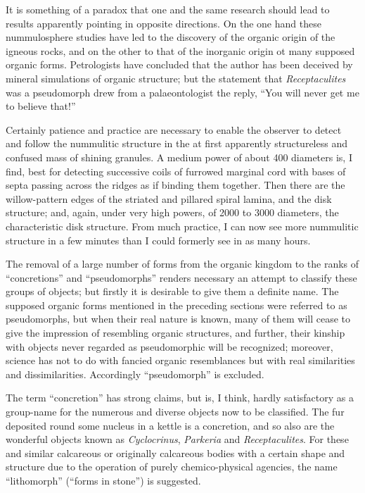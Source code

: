 \documentclass[a4paper, 12pt, oneside]{article}
\begin{document}
It is something of a paradox that one and the same research should lead to results apparently pointing in opposite directions. On the one hand these nummulosphere studies have led to the discovery of the organic origin of the igneous rocks, and on the other to that of the inorganic origin ot many supposed organic forms. Petrologists have concluded that the author has been deceived by mineral simulations of organic structure; but the statement that \emph{Receptaculites} was a pseudomorph drew from a palaeontologist the reply, ``You will never get me to believe that!''

Certainly patience and practice are necessary to enable the observer to detect and follow the nummulitic structure in the at first apparently structureless and confused mass of shining granules. A medium power of about 400 diameters is, I find, best for detecting successive coils of furrowed marginal cord with bases of septa passing across the ridges as if binding them together. Then there are the willow-pattern edges of the striated and pillared spiral lamina, and the disk structure; and, again, under very high powers, of 2000 to 3000 diameters, the characteristic disk structure. From much practice, I can now see more nummulitic structure in a few minutes than I could formerly see in as many hours.

The removal of a large number of forms from the organic kingdom to the ranks of ``concretions'' and ``pseudomorphs'' renders necessary an attempt to classify these groups of objects; but firstly it is desirable to give them a definite name. The supposed organic forms mentioned in the preceding sections were referred to as pseudomorphs, but when their real nature is known, many of them will cease to give the impression of resembling organic structures, and further, their kinship with objects never regarded as pseudomorphic will be recognized; moreover, science has not to do with fancied organic resemblances but with real similarities and dissimilarities. Accordingly ``pseudomorph'' is excluded.

The term ``concretion'' has strong claims, but is, I think, hardly satisfactory as a group-name for the numerous and diverse objects now to be classified. The fur deposited round some nucleus in a kettle is a concretion, and so also are the wonderful objects known as \emph{Cyclocrinus}, \emph{Parkeria} and \emph{Receptaculites}. For these and similar calcareous or originally calcareous bodies with a certain shape and structure due to the operation of purely chemico-physical agencies, the name ``lithomorph'' (``forms in stone'') is suggested.
\end{document}
